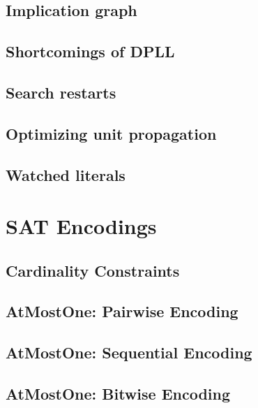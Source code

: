 \documentclass[12pt,a4paper,twoside]{book}
\begin{document}
\section{Implication graph}

\label{s_6_4}

\section{Shortcomings of DPLL}

\label{s_6_5}

\section{Search restarts}

\label{s_6_6}

\section{Optimizing unit propagation}

\label{s_6_7}

\section{Watched literals}

\label{s_6_8}

\chapter{SAT Encodings}

\label{c_7}

\section{Cardinality Constraints}

\label{s_7_1}

\section{AtMostOne: Pairwise Encoding}

\label{s_7_2}

\section{AtMostOne: Sequential Encoding}

\label{s_7_3}

\section{AtMostOne: Bitwise Encoding}

\label{s_7_4}
\end{document}
